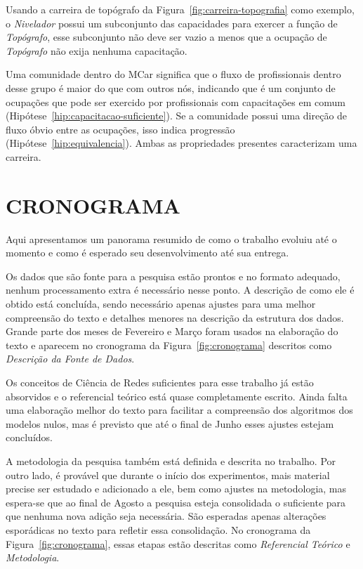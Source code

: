 \documentclass[12pt,a4paper]{article}
\begin{document}
Usando a carreira de topógrafo da Figura~\ref{fig:carreira-topografia} como exemplo, o \textit{Nivelador} possui um subconjunto das capacidades para exercer a função de \textit{Topógrafo}, esse subconjunto não deve ser vazio a menos que a ocupação de \textit{Topógrafo} não exija nenhuma capacitação.

\begin{hypothesis}
    Uma comunidade dentro do MCar significa que o fluxo de profissionais dentro desse grupo é maior do que com outros nós, indicando que é um conjunto de ocupações que pode ser exercido por profissionais com capacitações em comum (Hipótese~\ref{hip:capacitacao-suficiente}). Se a comunidade possui uma direção de fluxo óbvio entre as ocupações, isso indica progressão (Hipótese~\ref{hip:equivalencia}). Ambas as propriedades presentes caracterizam uma carreira.
\end{hypothesis}


\section{CRONOGRAMA}

Aqui apresentamos um panorama resumido de como o trabalho evoluiu até o momento e como é esperado seu desenvolvimento até sua entrega.

Os dados que são fonte para a pesquisa estão prontos e no formato adequado, nenhum processamento extra é necessário nesse ponto. A descrição de como ele é obtido está concluída, sendo necessário apenas ajustes para uma melhor compreensão do texto e detalhes menores na descrição da estrutura dos dados. Grande parte dos meses de Fevereiro e Março foram usados na elaboração do texto e aparecem no cronograma da Figura~\ref{fig:cronograma} descritos como \textit{Descrição da Fonte de Dados}.

Os conceitos de Ciência de Redes suficientes para esse trabalho já estão absorvidos e o referencial teórico está quase completamente escrito. Ainda falta uma elaboração melhor do texto para facilitar a compreensão dos algoritmos dos modelos nulos, mas é previsto que até o final de Junho esses ajustes estejam concluídos.

A metodologia da pesquisa também está definida e descrita no trabalho. Por outro lado, é provável que durante o início dos experimentos, mais material precise ser estudado e adicionado a ele, bem como ajustes na metodologia, mas espera-se que ao final de Agosto a pesquisa esteja consolidada o suficiente para que nenhuma nova adição seja necessária. São esperadas apenas alterações esporádicas no texto para refletir essa consolidação. No cronograma da Figura~\ref{fig:cronograma}, essas etapas estão descritas como \textit{Referencial Teórico} e \textit{Metodologia}.
\end{document}
